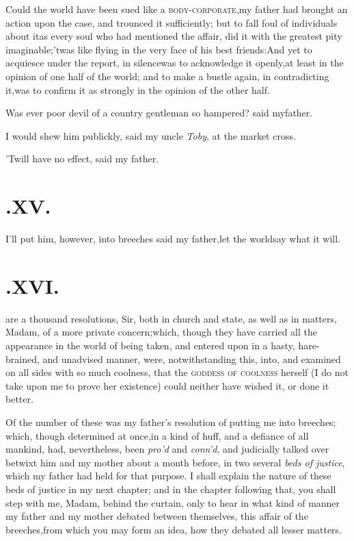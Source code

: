 \documentclass{article}
\begin{document}
Could the world have been sued like a
\textsc{body-corporate},\tsk my father had brought an
action upon the case, and trounced it sufficiently; but to fall
foul of individuals about it\tsh as every soul who had
mentioned the affair, did it with the greatest pity
imaginable;\tsh\break ’twas like flying in the very face
of his best friends:\tsh And yet to acquiesce under the
report, in silence\tsk was to acknowledge it openly,\tsk at
least in the opinion of one half of the world; and to make a bustle
again, in contradicting it,\tsk was to confirm it as strongly in
the opinion of the other half.\tsh

\tsh Was ever poor devil of a country gentleman so
hampered? said my\break father.

I would shew him publickly, said my uncle \textit{Toby}, at the
market cross.

\tsh ’Twill have no effect, said my father.

\section{.\enspace XV.}

\tsh I’ll put him, however, into\break
breeches said my father,\tsk let the world\break say what it will.

\section{.\enspace XVI.}

 are a thousand resolutions,\break
Sir, both in church and state, as well as in matters, Madam, of a
more private concern;\tsk which, though they have carried all the
appearance in the world of being taken, and entered upon in a
hasty, hare-brained, and unadvised manner, were, notwithstanding
this,
 into, and
examined on all sides with so much coolness, that the
\textsc{goddess of coolness} herself (I do not take upon me
to prove her existence) could neither have wished it, or done it
better.

Of the number of these was my father’s resolution of
putting me into breeches; which, though determined\break
at once,\tsk in a kind of huff, and a defi\-ance of all mankind, had,
nevertheless,\break
been \textit{pro’d} and \textit{conn’d}, and
judicially talked over betwixt him and my mother about a month
before, in two several \textit{beds of justice}, which my father had
held for that purpose. I shall explain the nature of these beds of
justice in my next chapter; and in the chapter following that, you
shall step with me, Madam, behind the curtain, only to hear in what
kind of manner my father and my mother debated between themselves,
this affair of the breeches,\tsk from which you may form an idea,
how they debated all lesser matters.
\end{document}
